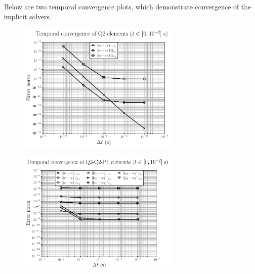 Below are two temporal convergence plots, which demonstrate convergence of the implicit solvers.

\begin{figure}[htb!]
\centering
\includegraphics[width=0.7\textwidth]{./Cases/MMS/figures/u_t_L2.pdf}
\end{figure}
\begin{figure}[htb!]
\centering
\includegraphics[width=0.7\textwidth]{./Cases/MMS/figures/uufpf_t_L2.pdf}
\end{figure}
